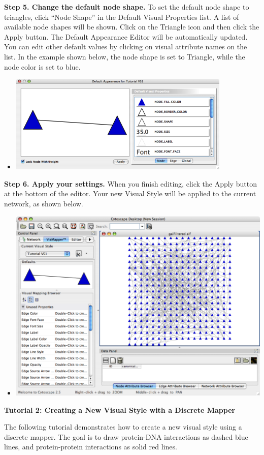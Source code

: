  \textbf{Step 5. Change the default node shape.}
 To set the default node shape to triangles, click ``Node Shape'' in the Default Visual Properties list. A list of available node shapes will be shown. Click on the Triangle icon and then click the Apply button. The Default Appearance Editor will be automatically updated. You can edit other default values by clicking on visual attribute names on the list. In the example shown below, the node shape is set to Triangle, while the node color is set to blue. 
\begin{itemize}
\item 

 \includegraphics[width=.6\textwidth]{images/TriangleDefaultEditor.png} 


\end{itemize}


 \textbf{Step 6. Apply your settings.}
 When you finish editing, click the Apply button at the bottom of the editor. Your new Visual Style will be applied to the current network, as shown below. 
\begin{itemize}
\item 

 \includegraphics[width=.6\textwidth]{images/Tut1GalFiltered.png} 


\end{itemize}


 
\textbf{Tutorial 2: Creating a New Visual Style with a Discrete Mapper}


 The following tutorial demonstrates how to create a new visual style using a discrete mapper. The goal is to draw protein-DNA interactions as dashed blue lines, and protein-protein interactions as solid red lines. 


